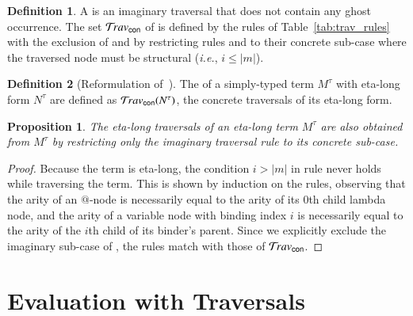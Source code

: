 \documentclass{elsarticle}
\makeatletter
\theoremstyle{plain}
\newtheorem{proposition}[theorem]{Proposition}
\theoremstyle{definition}
\newtheorem{definition}{Definition}[section]
\newcommand{\ghostvar}{\mathsf{x\mkern-5mu x}}
\newcommand{\concrete}{{\sf con}}
\renewcommand\ie{{\it i.e.\@\xspace}}
\makeatother
\begin{document}
\begin{definition}
\label{def:concrete_traversals}
A  is an imaginary traversal that does not contain
any ghost occurrence.
%
The set $\travset_\concrete$ of 
is defined by the rules of Table~\ref{tab:trav_rules}
with the exclusion of \rulenamet{Lam^\ghostvar} and by restricting rules  and  to their concrete sub-case where the traversed node must be structural (\ie, $i\leq|m|$).
\end{definition}

\begin{definition}[Reformulation of~\cite{BlumPhd}]
The  of a simply-typed term $M^\tau$ with eta-long form $N^\tau$ are defined as $\travset_{\concrete}(N^\tau)$, the concrete traversals of its eta-long form.
\end{definition}

\begin{proposition}
\label{prop:ulc_and_stlc_trav_coincide}
The eta-long traversals of an eta-long term $M^\tau$ are also obtained from
$M^\tau$ by restricting only the imaginary traversal rule  to its concrete sub-case.
\end{proposition}
\begin{proof}
Because the term is eta-long, the condition $i>|m|$ in rule  never holds while traversing the term. This is shown by induction on the rules, observing that the arity of an $@$-node is necessarily equal to the arity of its $0$th child lambda node, and the arity of a variable node with binding index $i$ is necessarily equal to the arity of the $i$th child of its binder's parent.
Since we explicitly exclude the imaginary sub-case of , the rules match with those of $\travset_\concrete$.
\end{proof}


\section{Evaluation with Traversals}
\label{sec:normalizing_trav}
\end{document}
